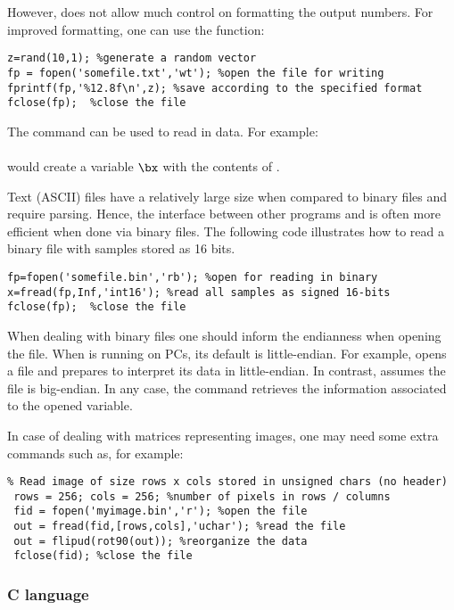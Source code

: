 However,  does not allow much control on formatting the output numbers. For improved formatting, one can use the  function:
\begin{lstlisting}
z=rand(10,1); %generate a random vector
fp = fopen('somefile.txt','wt'); %open the file for writing
fprintf(fp,'%12.8f\n',z); %save according to the specified format
fclose(fp);  %close the file
\end{lstlisting}

The command  can be used to read in data. For example:\\
\\
would create a variable $\bx$ with the contents of .

Text (ASCII) files have a relatively large size when compared to binary files and require parsing. Hence, the interface  between other programs and {\matlab} is often more efficient when done via binary files. The following code illustrates how to read a binary file with samples stored as 16 bits.
\begin{lstlisting}
fp=fopen('somefile.bin','rb'); %open for reading in binary
x=fread(fp,Inf,'int16'); %read all samples as signed 16-bits
fclose(fp);  %close the file
\end{lstlisting}

When dealing with binary files one should inform the endianness when opening the file. When {\matlab} is running on PCs, its default is little-endian. For example, 
 opens a file and prepares to interpret its data in little-endian. In contrast,  assumes the file is big-endian. In any case, the command  retrieves the information associated to the opened  variable.

In case of dealing with matrices representing images, one may need some extra commands such as, for example:
\begin{lstlisting}
% Read image of size rows x cols stored in unsigned chars (no header)
 rows = 256; cols = 256; %number of pixels in rows / columns
 fid = fopen('myimage.bin','r'); %open the file
 out = fread(fid,[rows,cols],'uchar'); %read the file
 out = flipud(rot90(out)); %reorganize the data
 fclose(fid); %close the file
\end{lstlisting}


\subsubsection{C language}

